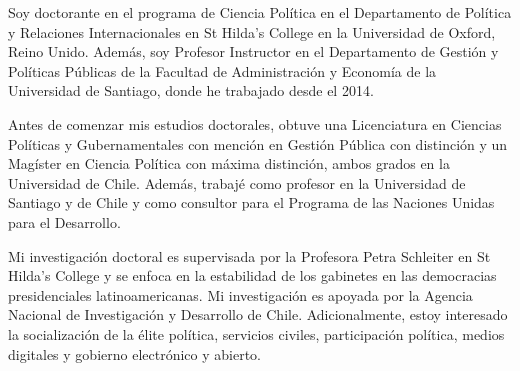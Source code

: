 




\vspace{3mm}

\begin{cvparagraph}

Soy doctorante en el programa de Ciencia Política en el Departamento de Política y Relaciones Internacionales en St Hilda's College en la Universidad de Oxford, Reino Unido. Además, soy Profesor Instructor en el Departamento de Gestión y Políticas Públicas de la Facultad de Administración y Economía de la Universidad de Santiago, donde he trabajado desde el 2014.

Antes de comenzar mis estudios doctorales, obtuve una Licenciatura en Ciencias Políticas y Gubernamentales con mención en Gestión Pública con distinción y un Magíster en Ciencia Política con máxima distinción, ambos grados en la Universidad de Chile. Además, trabajé como profesor en la Universidad de Santiago y de Chile y como consultor para el Programa de las Naciones Unidas para el Desarrollo.

Mi investigación doctoral es supervisada por la Profesora Petra Schleiter en St Hilda's College y se enfoca en la estabilidad de los gabinetes en las democracias presidenciales latinoamericanas. Mi investigación es apoyada por la Agencia Nacional de Investigación y Desarrollo de Chile. Adicionalmente, estoy interesado la socialización de la élite política, servicios civiles, participación política, medios digitales y gobierno electrónico y abierto.
\vspace{1mm}
\end{cvparagraph}
